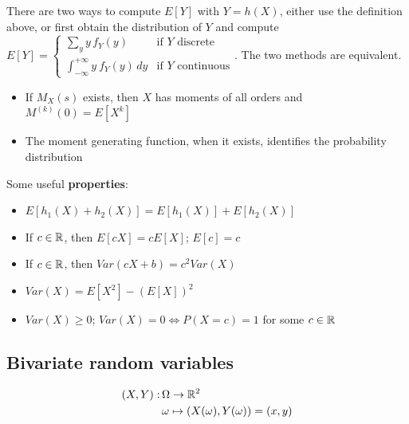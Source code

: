 There are two ways to compute $E[Y]$ with $Y=h(X)$, either use the definition above, or first obtain the distribution of $Y$
and compute
$\displaystyle E[Y] = 
\begin{cases}
    \sum_{y}y\, f_Y(y) & \text{if $Y$ discrete}\\
    \int_{-\infty}^{+\infty}y\ f_Y(y)\, dy & \text{if $Y$ continuous}
\end{cases}$. The two methods are equivalent.
\begin{itemize}
    \item If $M_X(s)$ exists, then $X$ has moments of all orders and $M^{(k)}(0) = E[X^k]$
    \item The moment generating function, when it exists, identifies the probability distribution
\end{itemize}
Some useful \textbf{properties}:
\begin{itemize}
    \item $E[h_1(X) + h_2(X)] = E[h_1(X)] + E[h_2(X)]$
    \item If $c\in\mathbb{R}$, then $E[cX] = cE[X]$; $E[c] = c$
    \item If $c\in\mathbb{R}$, then $Var(cX+b)=c^2Var(X)$
    \item $Var(X) = E[X^2]-(E[X])^2$
    \item $Var(X)\geq 0$; $Var(X) = 0\Leftrightarrow P(X=c)=1$ for some $c\in\mathbb{R}$
\end{itemize}

\subsection{Bivariate random variables}

\begin{equation*}
\begin{split}
    (X,Y): & \,\Omega\to\mathbb{R}^2\\
        & \,\omega\mapsto(X(\omega),Y(\omega))=(x,y)
\end{split}    
\end{equation*}

